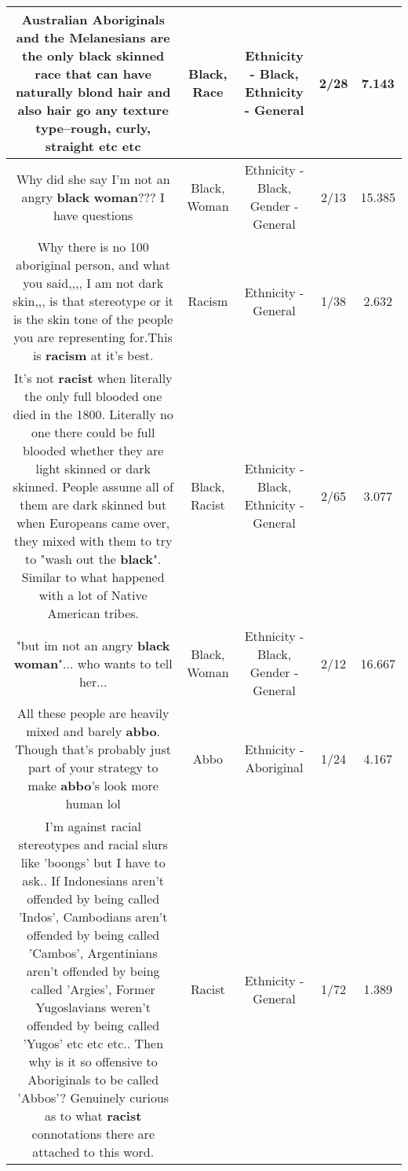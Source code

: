 \documentclass[11pt]{article}
\newlength\mylength
\begin{document}
\begin{center}
\begin{longtable}{|C{.65\mylength}|C{.30\mylength}|C{.12\mylength}|C{.12\mylength}|C{.12\mylength}|}
  \small Australian Aboriginals and the Melanesians are the only \textbf{black} skinned \textbf{race} that can have naturally blond hair and also hair go any texture type--rough, curly, straight etc etc\normalsize   & Black, Race & Ethnicity - Black, Ethnicity - General & 2/28 & 7.143 \\  \hline
  \small Why did she say I'm not an angry \textbf{black} \textbf{woman}??? I have questions\normalsize   & Black, Woman & Ethnicity - Black, Gender - General & 2/13 & 15.385 \\  \hline
  \small Why there is no 100 aboriginal person, and what you said,,,, I am not dark skin,,, is that stereotype or it is the skin tone of the people you are representing for.This is \textbf{racism} at it's best.\normalsize   & Racism & Ethnicity - General & 1/38 & 2.632 \\  \hline
  \small It's not \textbf{racist} when literally the only full blooded one died in the 1800. Literally no one there could be full blooded whether they are light skinned or dark skinned. People assume all of them are dark skinned but when Europeans came over, they mixed with them to try to "wash out the \textbf{black}". Similar to what happened with a lot of Native American tribes.\normalsize   & Black, Racist & Ethnicity - Black, Ethnicity - General & 2/65 & 3.077 \\  \hline
  \small "but im not an angry \textbf{black} \textbf{woman}"... who wants to tell her...\normalsize   & Black, Woman & Ethnicity - Black, Gender - General & 2/12 & 16.667 \\  \hline
  \small All these people are heavily mixed and barely \textbf{abbo}. Though that's probably just part of your strategy to make \textbf{abbo}'s look more human lol\normalsize   & Abbo & Ethnicity - Aboriginal & 1/24 & 4.167 \\  \hline
  \small I'm against racial stereotypes and racial slurs like 'boongs' but I have to ask.. If Indonesians aren't offended by being called 'Indos', Cambodians aren't offended by being called 'Cambos', Argentinians aren't offended by being called 'Argies', Former Yugoslavians weren't offended by being called 'Yugos' etc etc etc.. Then why is it so offensive to Aboriginals to be called 'Abbos'? Genuinely curious as to what \textbf{racist} connotations there are attached to this word.\normalsize   & Racist & Ethnicity - General & 1/72 & 1.389 \\  \hline

\end{longtable}
\end{center}
\end{document}
